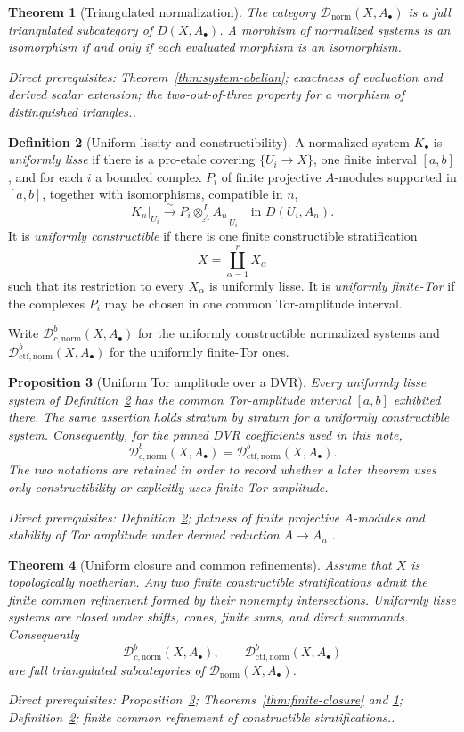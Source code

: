 \documentclass[10pt]{article}
\newtheorem{theorem}{Theorem}[section]
\newtheorem{proposition}[theorem]{Proposition}
\theoremstyle{definition}
\newtheorem{definition}[theorem]{Definition}
\newcommand{\Dbcnorm}{\mathcal D^b_{c,\mathrm{norm}}}
\newcommand{\Dctfnorm}{\mathcal D^b_{\mathrm{ctf},\mathrm{norm}}}
\newcommand{\Dnorm}{\mathcal D_{\mathrm{norm}}}
\newcommand{\depends}[1]{\par\smallskip\noindent\textit{Direct prerequisites:} #1.}
\begin{document}
\begin{theorem}[Triangulated normalization]\label{thm:normalized-triangulated}
The category $\Dnorm(X,A_\bullet)$ is a full triangulated subcategory of
$D(X,A_\bullet)$.  A morphism of normalized systems is an isomorphism if
and only if each evaluated morphism is an isomorphism.
\depends{Theorem~\ref{thm:system-abelian}; exactness of evaluation and
derived scalar extension; the two-out-of-three property for a morphism of
distinguished triangles.}
\end{theorem}

\begin{definition}[Uniform lissity and constructibility]
\label{def:uniform-constructible}
A normalized system $K_\bullet$ is \emph{uniformly lisse} if there is a
pro-etale covering $\{U_i\to X\}$, one finite interval $[a,b]$, and for
each $i$ a bounded complex $P_i$ of finite projective $A$-modules supported
in $[a,b]$, together with isomorphisms, compatible in $n$,
\[
 K_n|_{U_i}\xrightarrow{\sim}
 \underline{P_i\otimes_A^LA_n}_{\,U_i}
 \quad\text{in }D(U_i,A_n).
\]
It is \emph{uniformly constructible} if there is one finite constructible
stratification
\[
 X=\coprod_{\alpha=1}^r X_\alpha
\]
such that its restriction to every $X_\alpha$ is uniformly lisse.  It is
\emph{uniformly finite-Tor} if the complexes $P_i$ may be chosen in one
common Tor-amplitude interval.

Write $\Dbcnorm(X,A_\bullet)$ for the uniformly constructible
normalized systems and $\Dctfnorm(X,A_\bullet)$ for the
uniformly finite-Tor ones.
\end{definition}

\begin{proposition}[Uniform Tor amplitude over a DVR]
\label{prop:uniform-tor-dvr}
Every uniformly lisse system of
Definition~\ref{def:uniform-constructible} has the common Tor-amplitude
interval $[a,b]$ exhibited there.  The same assertion holds stratum by
stratum for a uniformly constructible system.  Consequently, for the
pinned DVR coefficients used in this note,
\[
 \Dbcnorm(X,A_\bullet)=\Dctfnorm(X,A_\bullet).
\]
The two notations are retained in order to record whether a later theorem
uses only constructibility or explicitly uses finite Tor amplitude.
\depends{Definition~\ref{def:uniform-constructible}; flatness of finite
projective $A$-modules and stability of Tor amplitude under derived
reduction $A\to A_n$.}
\end{proposition}

\begin{theorem}[Uniform closure and common refinements]
\label{thm:uniform-closure}
Assume that $X$ is topologically noetherian.  Any two finite constructible
stratifications admit the finite common refinement formed by their nonempty
intersections.  Uniformly lisse systems are closed under shifts, cones,
finite sums, and direct summands.  Consequently
\[
 \Dbcnorm(X,A_\bullet),\qquad
 \Dctfnorm(X,A_\bullet)
\]
are full triangulated subcategories of
$\Dnorm(X,A_\bullet)$.
\depends{Proposition~\ref{prop:uniform-tor-dvr};
Theorems~\ref{thm:finite-closure} and
\ref{thm:normalized-triangulated}; Definition~\ref{def:uniform-constructible};
finite common refinement of constructible stratifications.}
\end{theorem}
\end{document}
